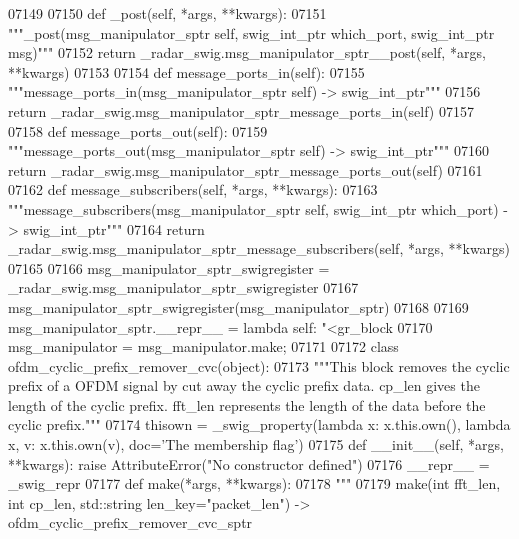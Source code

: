 \begin{DoxyCode}
{{{{{{{{{{{{{{{{{{{{{{{07149 
07150     \textcolor{keyword}{def }_post(self, *args, **kwargs):
07151         \textcolor{stringliteral}{"""\_post(msg\_manipulator\_sptr self, swig\_int\_ptr which\_port, swig\_int\_ptr msg)"""}
07152         \textcolor{keywordflow}{return} \_radar\_swig.msg\_manipulator\_sptr\_\_post(self, *args, **kwargs)
07153 
07154     \textcolor{keyword}{def }message_ports_in(self):
07155         \textcolor{stringliteral}{"""message\_ports\_in(msg\_manipulator\_sptr self) -> swig\_int\_ptr"""}
07156         \textcolor{keywordflow}{return} \_radar\_swig.msg\_manipulator\_sptr\_message\_ports\_in(self)
07157 
07158     \textcolor{keyword}{def }message_ports_out(self):
07159         \textcolor{stringliteral}{"""message\_ports\_out(msg\_manipulator\_sptr self) -> swig\_int\_ptr"""}
07160         \textcolor{keywordflow}{return} \_radar\_swig.msg\_manipulator\_sptr\_message\_ports\_out(self)
07161 
07162     \textcolor{keyword}{def }message_subscribers(self, *args, **kwargs):
07163         \textcolor{stringliteral}{"""message\_subscribers(msg\_manipulator\_sptr self, swig\_int\_ptr which\_port) -> swig\_int\_ptr"""}
07164         \textcolor{keywordflow}{return} \_radar\_swig.msg\_manipulator\_sptr\_message\_subscribers(self, *args, **kwargs)
07165 
07166 msg\_manipulator\_sptr\_swigregister = \_radar\_swig.msg\_manipulator\_sptr\_swigregister
07167 msg_manipulator_sptr_swigregister(msg\_manipulator\_sptr)
07168 
07169 msg\_manipulator\_sptr.\_\_repr\_\_ = \textcolor{keyword}{lambda} self: \textcolor{stringliteral}{"<gr\_block %
07170 msg\_manipulator = msg\_manipulator.make;
07171 
07172 \textcolor{keyword}{class }ofdm_cyclic_prefix_remover_cvc(object):
07173     \textcolor{stringliteral}{"""This block removes the cyclic prefix of a OFDM signal by cut away the cyclic prefix data. cp\_len
       gives the length of the cyclic prefix. fft\_len represents the length of the data before the cyclic prefix."""}
07174     thisown = _swig_property(\textcolor{keyword}{lambda} x: x.this.own(), \textcolor{keyword}{lambda} x, v: x.this.own(v), doc=\textcolor{stringliteral}{'The membership flag'})
07175     \textcolor{keyword}{def }__init__(self, *args, **kwargs): \textcolor{keywordflow}{raise} AttributeError(\textcolor{stringliteral}{"No constructor defined"})
07176     \_\_repr\_\_ = \_swig\_repr
07177     \textcolor{keyword}{def }make(*args, **kwargs):
07178         \textcolor{stringliteral}{"""}
07179 \textcolor{stringliteral}{        make(int fft\_len, int cp\_len, std::string len\_key="packet\_len") ->
       ofdm\_cyclic\_prefix\_remover\_cvc\_sptr}
}}}}}}}}}}}}}}}}}}}}}}}}
\end{DoxyCode}
